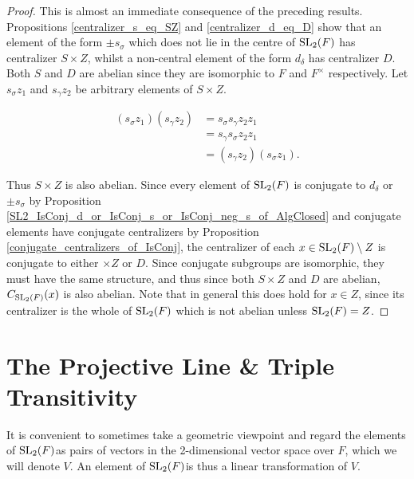 \begin{proof}
    \leanok
    This is almost an immediate consequence of the preceding results. Propositions \ref{centralizer_s_eq_SZ} and \ref{centralizer_d_eq_D} show that an element of the form $\pm s_\sigma$ which does not lie in the centre of $\operatorname{SL}_2(F)$ has centralizer $S \times Z$, whilst a non-central element of the form $d_\delta$ has centralizer $D$.
Both $S$ and $D$ are abelian since they are isomorphic to $F$ and $F^\times$ respectively. Let $s_\sigma z_1$ and $s_\gamma z_2$  be arbitrary elements of $S \times Z$.

\vspace{-.5mm}
\begin{align*} 
    (s_\sigma z_1)(s_\gamma z_2)  &= s_\sigma s_\gamma z_2 z_1  \tag{since  $z_1 \in Z$}
\\ &= s_\gamma s_\sigma z_2 z_1  \tag{since  $S$ is abelian}
\\ &= (s_\gamma z_2)(s_\sigma z_1).   \tag{since  $z_2 \in Z$}
\end{align*} 

Thus $S \times Z$ is also abelian. Since every element of $\operatorname{SL}_2(F)$ is conjugate to $d_\delta$ or $\pm s_\sigma$ by Proposition \ref{SL2_IsConj_d_or_IsConj_s_or_IsConj_neg_s_of_AlgClosed} and conjugate elements have conjugate centralizers by Proposition \ref{conjugate_centralizers_of_IsConj}, the centralizer of each $x \in \operatorname{SL}_2(F)\setminus Z$ is conjugate to either $\times Z$ or $D$. 
Since conjugate subgroups are isomorphic, they must have the same structure, and thus since both $S \times Z$ and $D$ are abelian, $C_{\operatorname{SL}_2(F)}(x)$ is also abelian. 
Note that in general this does hold for $x \in Z$, since its centralizer is the whole of $\operatorname{SL}_2(F)$ which is not abelian unless $\operatorname{SL}_2(F)= Z$.

\end{proof}




\section{The Projective Line \& Triple Transitivity}

It is convenient to sometimes take a geometric viewpoint and regard the elements of $\operatorname{SL}_2(F)$as pairs of vectors in the 2-dimensional vector space over $F$, which we will denote $V$. An element of $\operatorname{SL}_2(F)$is thus a linear transformation of $V$. 

